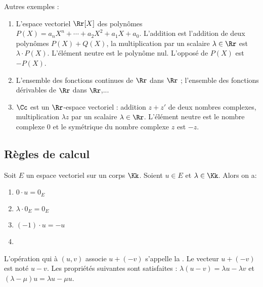 \documentclass[class=report,crop=false]{standalone}
\begin{document}
Autres exemples :
\begin{enumerate}
  \item L'espace vectoriel $\Rr[X]$ des polynômes $P(X) = a_nX^n+\cdots+a_2X^2+a_1X+a_0$.
  L'addition est l'addition de deux polynômes $P(X)+Q(X)$, la multiplication par un scalaire
  $\lambda \in \Rr$ est $\lambda \cdot P(X)$. L'élément neutre est le polynôme nul. L'opposé de $P(X)$ est $-P(X)$.
  \item L'ensemble des fonctions continues de $\Rr$ dans $\Rr$ ; l'ensemble des fonctions dérivables
  de $\Rr$ dans $\Rr$,...
  \item $\Cc$ est un $\Rr$-espace vectoriel : addition $z+z'$ de deux nombres complexes, multiplication $\lambda z$ par un scalaire
  $\lambda \in \Rr$. L'élément neutre est le nombre complexe $0$ et le symétrique du nombre complexe $z$
  est $-z$.
\end{enumerate}


\subsection{Règles de calcul}


\begin{proposition}
Soit $E$ un espace vectoriel sur un corps $\Kk$. Soient $u \in E$ et $\lambda \in \Kk$.
Alors on a:
 \begin{enumerate}
 \item $0 \cdot u = 0_E$
 \item $\lambda \cdot 0_E = 0_E$
 \item $(-1)\cdot u = -u$
 \item {}
 \end{enumerate}
\end{proposition}

L'opération qui à $(u,v)$ associe $u+(-v)$ s'appelle la .
 Le vecteur $u+(-v)$ est noté $u-v$.
 Les propriétés suivantes sont satisfaites : $\lambda (u-v)=\lambda u -\lambda v$
 et $(\lambda -\mu)u=\lambda u-\mu u$.
\end{document}
